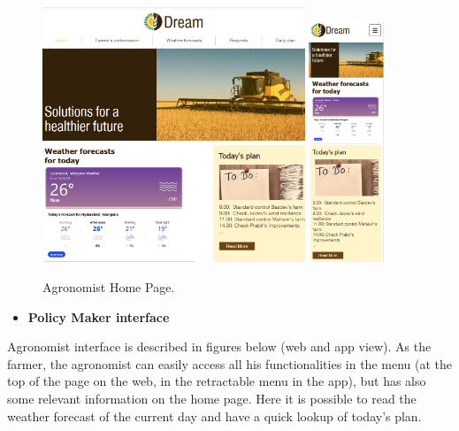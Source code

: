 \documentclass{article}
\begin{document}
    \begin{figure} [h]
        \centering
        \includegraphics[width=0.7\textwidth]{images/interfaces/AgronomistWeb.png}
        \quad
        \includegraphics[width=0.2\textwidth]{images/interfaces/AgronomistApp.png}
        \quad
        \caption{\label{fig:frog}Agronomist Home Page.}
    \end{figure}
    
    \newpage
    
    
    
    \begin{itemize}
        \item \textbf{Policy Maker interface}
    \end{itemize}
    
    Agronomist interface is described in figures below (web and app view). As the farmer, the agronomist can easily access all his functionalities in the menu (at the top of the page on the web, in the retractable menu in the app), but has also some relevant information on the home page. Here it is possible to read the weather forecast of the current day and have a quick lookup of today's plan.
    
\end{document}
